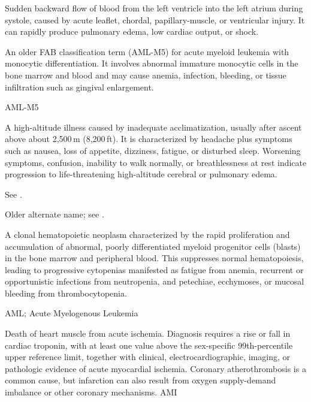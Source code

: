  Sudden backward flow of blood from the left ventricle into the left atrium during systole, caused by acute leaflet, chordal, papillary-muscle, or ventricular injury. It can rapidly produce pulmonary edema, low cardiac output, or shock.

 An older FAB classification term (AML-M5) for acute myeloid leukemia with monocytic differentiation. It involves abnormal immature monocytic cells in the bone marrow and blood and may cause anemia, infection, bleeding, or tissue infiltration such as gingival enlargement.

\synonyms
AML-M5

 A high-altitude illness caused by inadequate acclimatization, usually after ascent above about 2,500\,m (8,200\,ft). It is characterized by headache plus symptoms such as nausea, loss of appetite, dizziness, fatigue, or disturbed sleep. Worsening symptoms, confusion, inability to walk normally, or breathlessness at rest indicate progression to life-threatening high-altitude cerebral or pulmonary edema.

 See .

 Older alternate name; see .

 A clonal hematopoietic neoplasm characterized by the rapid proliferation and accumulation of abnormal, poorly differentiated myeloid progenitor cells (blasts) in the bone marrow and peripheral blood. This suppresses normal hematopoiesis, leading to progressive cytopenias manifested as fatigue from anemia, recurrent or opportunistic infections from neutropenia, and petechiae, ecchymoses, or mucosal bleeding from thrombocytopenia.

\synonyms
AML; Acute Myelogenous Leukemia

 Death of heart muscle from acute ischemia. Diagnosis requires a rise or fall in cardiac troponin, with at least one value above the sex-specific 99th-percentile upper reference limit, together with clinical, electrocardiographic, imaging, or pathologic evidence of acute myocardial ischemia. Coronary atherothrombosis is a common cause, but infarction can also result from oxygen supply-demand imbalance or other coronary mechanisms.
\synonyms
AMI


